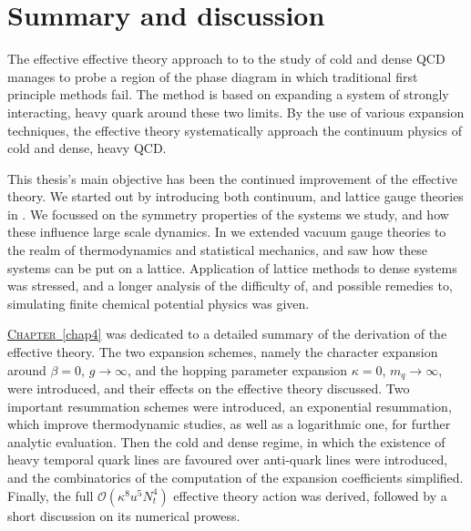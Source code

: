 \chapter{Summary and discussion}


The effective effective theory approach to to the study of cold and dense QCD
manages to probe a region of the phase diagram in which traditional first
principle methods fail. The method is based on expanding a system of strongly
interacting, heavy quark around these two limits. By the use of various
expansion techniques, the effective theory systematically approach the continuum
physics of cold and dense, heavy QCD.

This thesis's main objective has been the continued improvement of the effective
theory. We started out by introducing both continuum, and lattice gauge theories
in . We focussed on the symmetry properties of the systems we
study, and how these influence large scale dynamics. In  we
extended vacuum gauge theories to the realm of thermodynamics and statistical
mechanics, and saw how these systems can be put on a lattice.  Application of
lattice methods to dense systems was stressed, and a longer analysis of the
difficulty of, and possible remedies to, simulating finite chemical potential
physics was given.

\hyperref[chap4]{\mbox{\textsc{Chapter} \ref*{chap4}}} was dedicated to a
detailed summary of the derivation of the effective theory. The two expansion
schemes, namely the character expansion around $\beta = 0$, $g \to \infty$, and
the hopping parameter expansion $\kappa = 0$, $m_q \to \infty$, were introduced,
and their effects on the effective theory discussed. Two important resummation
schemes were introduced, an exponential resummation, which improve thermodynamic
studies, as well as a logarithmic one, for further analytic evaluation. Then the
cold and dense regime, in which the existence of heavy temporal quark lines are
favoured over anti-quark lines were introduced, and the combinatorics of the
computation of the expansion coefficients simplified. Finally, the full
$\mathcal{O}(\kappa^8 u^5 N_t^4)$ effective theory action was derived, followed
by a short discussion on its numerical prowess.

